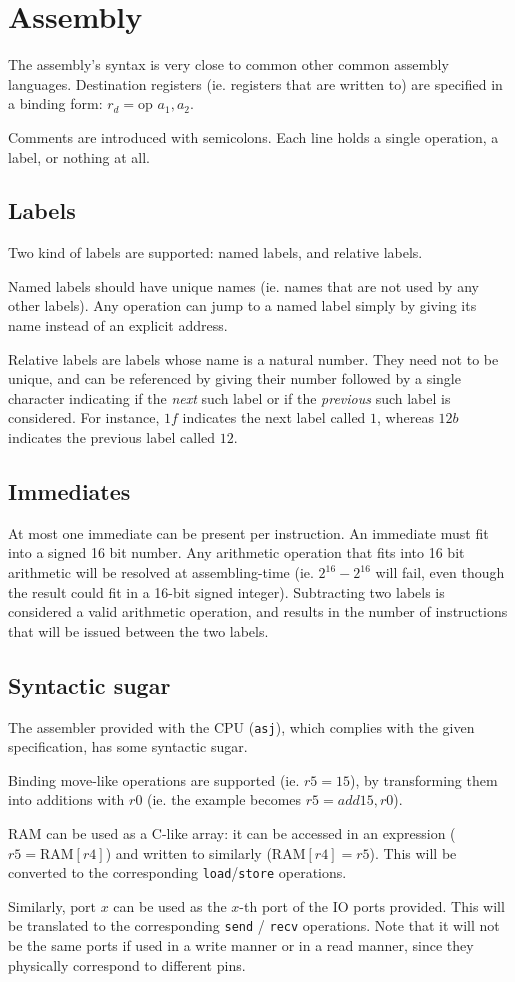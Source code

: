 \documentclass{scrartcl}
\begin{document}
\section*{Assembly}
The assembly's syntax is very close to common other common assembly
languages. Destination registers (ie. registers that are written to)
are specified in a binding form: \(r_d = \textrm{op } a_1, a_2\).\par
Comments are introduced with semicolons. Each line holds a single
operation, a label, or nothing at all.

\subsection*{Labels}
Two kind of labels are supported: named labels, and relative labels.\par
Named labels should have unique names (ie. names that are not used
by any other labels). Any operation can jump to a named label simply
by giving its name instead of an explicit address.\par
Relative labels are labels whose name is a natural number. They need
not to be unique, and can be referenced by giving their number
followed by a single character indicating if the \emph{next} such label
or if the \emph{previous} such label is considered. For instance,
\(1f\) indicates the next label called \(1\), whereas \(12b\) indicates
the previous label called \(12\).

\subsection*{Immediates}
At most one immediate can be present per instruction. An immediate
must fit into a signed 16 bit number. Any arithmetic operation that
fits into 16 bit arithmetic will be resolved at assembling-time
(ie. \(2^{16}-2^{16}\) will fail, even though the result could fit in
a 16-bit signed integer). Subtracting two labels is considered a valid
arithmetic operation, and results in the number of instructions
that will be issued between the two labels.

\subsection*{Syntactic sugar}
The assembler provided with the CPU (\verb|asj|), which complies with
the given specification, has some syntactic sugar.\par
Binding move-like operations are supported (ie. \(r5 = 15\)), by
transforming them into additions with \(r0\) (ie. the example becomes
\(r5 = add 15, r0\)).\par
\(\mathrm{RAM}\) can be used as a C-like array: it can be accessed
in an expression (\(r5 = \mathrm{RAM}[r4]\)) and written to similarly
(\(\mathrm{RAM}[r4] = r5\)). This will be converted to the
corresponding \verb|load|/\verb|store| operations.\par
Similarly, \(\textrm{port }x\) can be used as the \(x\)-th port of
the IO ports provided. This will be translated to the corresponding
\verb|send| / \verb|recv| operations. Note that it will not be the
same ports if used in a write manner or in a read manner, since they
physically correspond to different pins.
\end{document}
